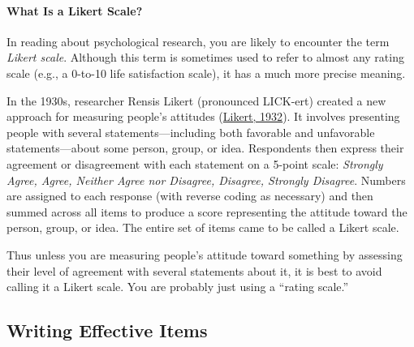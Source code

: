 \documentclass[
]{krantz}
\begin{document}
\hypertarget{what-is-a-likert-scale}{%
\paragraph*{What Is a Likert Scale?}\label{what-is-a-likert-scale}}

In reading about psychological research, you are likely to encounter the term \emph{Likert scale}. Although this term is sometimes used to refer to almost any rating scale (e.g., a 0-to-10 life satisfaction scale), it has a much more precise meaning.

In the 1930s, researcher Rensis Likert (pronounced LICK-ert) created a new approach for measuring people's attitudes (\protect\hyperlink{ref-likert1932technique}{Likert, 1932}). It involves presenting people with several statements---including both favorable and unfavorable statements---about some person, group, or idea. Respondents then express their agreement or disagreement with each statement on a 5-point scale: \emph{Strongly Agree, Agree, Neither Agree nor Disagree, Disagree, Strongly Disagree}. Numbers are assigned to each response (with reverse coding as necessary) and then summed across all items to produce a score representing the attitude toward the person, group, or idea. The entire set of items came to be called a Likert scale.

Thus unless you are measuring people's attitude toward something by assessing their level of agreement with several statements about it, it is best to avoid calling it a Likert scale. You are probably just using a ``rating scale.''

\hypertarget{writing-effective-items}{%
\subsection*{Writing Effective Items}\label{writing-effective-items}}
\end{document}
